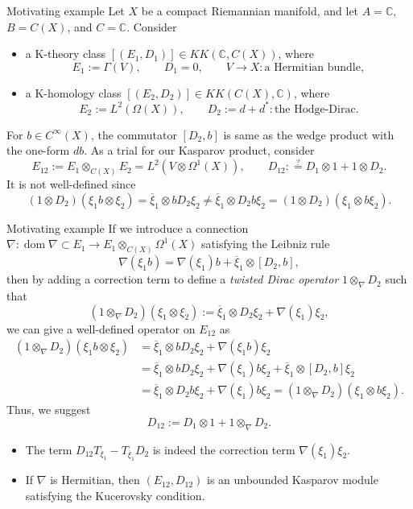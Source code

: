 \documentclass[handout]{../../../slide}
\begin{document}
\begin{frame}{Motivating example}
Let $X$ be a compact Riemannian manifold, and let $A=\mathbb{C}$, $B=C(X)$, and $C=\mathbb{C}$.
\pause
Consider
\begin{itemize}
\item a K-theory class $[(E_1,D_1)]\in KK(\mathbb{C},C(X))$, where
\[E_1:=\Gamma(V),\qquad D_1=0,\qquad V\to X:\text{a Hermitian bundle},\]
\item a K-homology class $[(E_2,D_2)]\in KK(C(X),\mathbb{C})$, where
\[E_2:=L^2(\Omega(X)),\qquad D_2:=d+d^*:\text{the Hodge-Dirac}.\]
\end{itemize}
For $b\in C^\infty(X)$, the commutator $[D_2,b]$ is same as the wedge product with the one-form $db$.
\pause
As a trial for our Kasparov product, consider
\[E_{12}:=E_1\otimes_{C(X)}E_2=L^2(V\otimes\Omega^1(X)),\qquad D_{12}:\stackrel{?}{=}D_1\otimes1+1\otimes D_2.\]
\pause
It is not well-defined since
\[(1\otimes D_2)(\xi_1b\otimes\xi_2)=\overline\xi_1\otimes bD_2\xi_2\ne\overline\xi_1\otimes D_2b\xi_2=(1\otimes D_2)(\xi_1\otimes b\xi_2).\]
\end{frame}



\begin{frame}{Motivating example}
If we introduce a connection $\nabla:\operatorname{dom}\nabla\subset E_1\to E_1\otimes_{C(X)}\Omega^1(X)$ satisfying the Leibniz rule
\[\nabla(\xi_1b)=\nabla(\xi_1)b+\overline\xi_1\otimes[D_2,b],\]
\pause
then by adding a correction term to define a \emph{twisted Dirac operator} $1\otimes_\nabla D_2$ such that
\[(1\otimes_\nabla D_2)(\xi_1\otimes\xi_2):=\overline\xi_1\otimes D_2\xi_2+\nabla(\xi_1)\xi_2,\]
\pause
we can give a well-defined operator on $E_{12}$ as
\begin{align*}
(1\otimes_\nabla D_2)(\xi_1b\otimes\xi_2)&=\overline\xi_1\otimes bD_2\xi_2+\nabla(\xi_1b)\xi_2\\
&=\overline\xi_1\otimes bD_2\xi_2+\nabla(\xi_1)b\xi_2+\overline\xi_1\otimes[D_2,b]\xi_2\\
&=\overline\xi_1\otimes D_2b\xi_2+\nabla(\xi_1)b\xi_2
=(1\otimes_\nabla D_2)(\xi_1\otimes b\xi_2).
\end{align*}
Thus, we suggest
\[D_{12}:=D_1\otimes1+1\otimes_\nabla D_2.\]
\vspace{-8pt}\pause
\begin{itemize}
\item The term $D_{12}T_{\xi_1}-T_{\overline\xi_1}D_2$ is indeed the correction term $\nabla(\xi_1)\xi_2$.
\item If $\nabla$ is Hermitian, then $(E_{12},D_{12})$ is an unbounded Kasparov module satisfying the Kucerovsky condition.
\end{itemize}
\end{frame}
\end{document}
